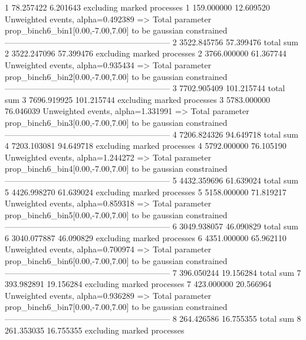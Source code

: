 1          78.257422       6.201643        excluding marked processes    
1          159.000000      12.609520       Unweighted events, alpha=0.492389
  => Total parameter prop_binch6_bin1[0.00,-7.00,7.00] to be gaussian constrained
------------------------------------------------------------
2          3522.845756     57.399476       total sum                     
2          3522.247096     57.399476       excluding marked processes    
2          3766.000000     61.367744       Unweighted events, alpha=0.935434
  => Total parameter prop_binch6_bin2[0.00,-7.00,7.00] to be gaussian constrained
------------------------------------------------------------
3          7702.905409     101.215744      total sum                     
3          7696.919925     101.215744      excluding marked processes    
3          5783.000000     76.046039       Unweighted events, alpha=1.331991
  => Total parameter prop_binch6_bin3[0.00,-7.00,7.00] to be gaussian constrained
------------------------------------------------------------
4          7206.824326     94.649718       total sum                     
4          7203.103081     94.649718       excluding marked processes    
4          5792.000000     76.105190       Unweighted events, alpha=1.244272
  => Total parameter prop_binch6_bin4[0.00,-7.00,7.00] to be gaussian constrained
------------------------------------------------------------
5          4432.359696     61.639024       total sum                     
5          4426.998270     61.639024       excluding marked processes    
5          5158.000000     71.819217       Unweighted events, alpha=0.859318
  => Total parameter prop_binch6_bin5[0.00,-7.00,7.00] to be gaussian constrained
------------------------------------------------------------
6          3049.938057     46.090829       total sum                     
6          3040.077887     46.090829       excluding marked processes    
6          4351.000000     65.962110       Unweighted events, alpha=0.700974
  => Total parameter prop_binch6_bin6[0.00,-7.00,7.00] to be gaussian constrained
------------------------------------------------------------
7          396.050244      19.156284       total sum                     
7          393.982891      19.156284       excluding marked processes    
7          423.000000      20.566964       Unweighted events, alpha=0.936289
  => Total parameter prop_binch6_bin7[0.00,-7.00,7.00] to be gaussian constrained
------------------------------------------------------------
8          264.426586      16.755355       total sum                     
8          261.353035      16.755355       excluding marked processes    
